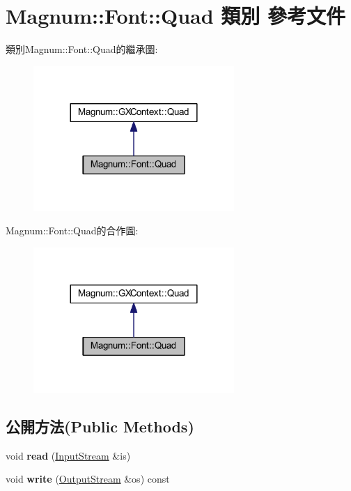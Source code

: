 \hypertarget{class_magnum_1_1_font_1_1_quad}{}\section{Magnum\+:\+:Font\+:\+:Quad 類別 參考文件}
\label{class_magnum_1_1_font_1_1_quad}


類別\+Magnum\+:\+:Font\+:\+:Quad的繼承圖\+:\nopagebreak
\begin{figure}[H]
\begin{center}
\leavevmode
\includegraphics[width=216pt]{class_magnum_1_1_font_1_1_quad__inherit__graph}
\end{center}
\end{figure}


Magnum\+:\+:Font\+:\+:Quad的合作圖\+:\nopagebreak
\begin{figure}[H]
\begin{center}
\leavevmode
\includegraphics[width=216pt]{class_magnum_1_1_font_1_1_quad__coll__graph}
\end{center}
\end{figure}
\subsection*{公開方法(Public Methods)}
\begin{DoxyCompactItemize}
\item 
void {\bfseries read} (\hyperlink{class_magnum_1_1_input_stream}{Input\+Stream} \&is)\hypertarget{class_magnum_1_1_font_1_1_quad_aa974bb54952577c842a6480dda1bf1d7}{}\label{class_magnum_1_1_font_1_1_quad_aa974bb54952577c842a6480dda1bf1d7}

\item 
void {\bfseries write} (\hyperlink{class_magnum_1_1_output_stream}{Output\+Stream} \&os) const \hypertarget{class_magnum_1_1_font_1_1_quad_a56e38bcf523d65a5424f090f4e0e54a8}{}\label{class_magnum_1_1_font_1_1_quad_a56e38bcf523d65a5424f090f4e0e54a8}

\end{DoxyCompactItemize}
